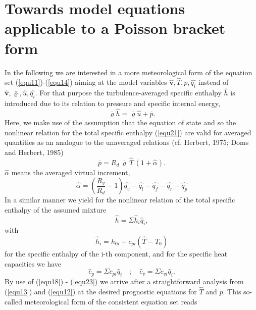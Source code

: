 \section{ Towards model equations applicable to a Poisson bracket form }
In the following we are interested in a more meteorological form of the equation set (\ref{equ11})-(\ref{equ14}) aiming at the model variables $\hat{\mathbf{v}},\hat{T},\bar{p},\hat{q_i}$ instead of $\hat{\mathbf{v}},\bar{\varrho},\hat{u},\hat{q_i}$. For that purpose the turbulence-averaged specific enthalpy $\hat{h}$ is introduced due to its relation to pressure and specific internal energy,
\begin{equation}
\overline{\varrho} \hat{h}= \overline{\varrho} \hat{u} + \overline{p} .\label{equ18}
\end{equation} 
Here, we make use of the assumption that the equation of state and so the nonlinear relation for the total specific enthalpy (\ref{equ21}) are valid for averaged quantities as an analogue to the unaveraged relations (cf. Herbert, 1975; Doms and Herbert, 1985)
\begin{equation}
\overline{p}=R_d \,\overline{\varrho} \,\hat{T}\, (1 + \hat{\alpha})  .\label{equ19}
\end{equation} 
$\hat{\alpha}$ means the averaged virtual increment,
\begin{equation}
\hat{\alpha} = \left( \frac{R_v}{R_d} - 1\right)\hat{q_v} - \hat{q_l} -
\hat{q_f} - \hat{q_r} - \hat{q_p} \label{equ20}
\end{equation} 
In a similar manner we yield for the nonlinear relation of the total specific enthalpy of the assumed mixture
\begin{equation}
\hat{h} = \Sigma \hat{h}_i \hat{q}_i , \label{equ21}
\end{equation} 
with 
\begin{equation}
\hat{h}_i = h_{0 i} + c_{p i} ( \hat{T} - T_0) \label{equ22}
\end{equation} 
for the specific enthalpy of the i-th component, and for the specific heat capacities we have 
\begin{equation}
\hat{c}_p = \Sigma c_{p i} \hat{q}_i \quad;\quad \hat{c}_v = \Sigma c_{v i} \hat{q}_i . \label{equ23}
\end{equation}  
By use of (\ref{equ18}) - (\ref{equ23}) we arrive after a straightforward analysis from  (\ref{equ13}) and (\ref{equ12}) at the desired prognostic equations for $\hat{T}$ and $\overline{p}$. This so-called meteorological form of the consistent equation set reads
